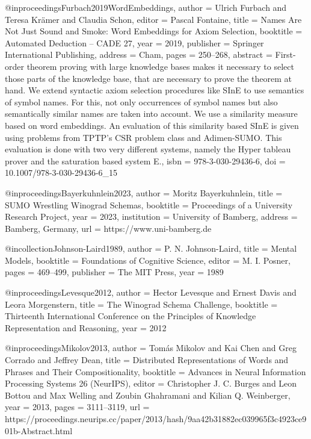 \documentclass[english,version-2020-11]{uzl-thesis}
\begin{document}
\begin{bibtex-entries}
@inproceedings{Furbach2019WordEmbeddings,
  author    = {Ulrich Furbach and Teresa Kr{\"a}mer and Claudia Schon},
  editor    = {Pascal Fontaine},
  title     = {Names Are Not Just Sound and Smoke: Word Embeddings for Axiom Selection},
  booktitle = {Automated Deduction -- CADE 27},
  year      = {2019},
  publisher = {Springer International Publishing},
  address   = {Cham},
  pages     = {250--268},
  abstract  = {First-order theorem proving with large knowledge bases makes it necessary to select those parts of the knowledge base, that are necessary to prove the theorem at hand. We extend syntactic axiom selection procedures like SInE to use semantics of symbol names. For this, not only occurrences of symbol names but also semantically similar names are taken into account. We use a similarity measure based on word embeddings. An evaluation of this similarity based SInE is given using problems from TPTP's CSR problem class and Adimen-SUMO. This evaluation is done with two very different systems, namely the Hyper tableau prover and the saturation based system E.},
  isbn      = {978-3-030-29436-6},
  doi       = {10.1007/978-3-030-29436-6_15}
}

@inproceedings{Bayerkuhnlein2023,
  author    = {Moritz Bayerkuhnlein},
  title     = {SUMO Wrestling Winograd Schemas},
  booktitle = {Proceedings of a University Research Project},
  year      = {2023},
  institution = {University of Bamberg},
  address   = {Bamberg, Germany},
  url       = {https://www.uni-bamberg.de}
}

@incollection{Johnson-Laird1989,
  author    = {P. N. Johnson-Laird},
  title     = {Mental Models},
  booktitle = {Foundations of Cognitive Science},
  editor    = {M. I. Posner},
  pages     = {469--499},
  publisher = {The MIT Press},
  year      = {1989}
}

@inproceedings{Levesque2012,
  author    = {Hector Levesque and Ernest Davis and Leora Morgenstern},
  title     = {The Winograd Schema Challenge},
  booktitle = {Thirteenth International Conference on the Principles of Knowledge Representation and Reasoning},
  year      = {2012}
}

@inproceedings{Mikolov2013,
  author    = {Tom{\'a}s Mikolov and Kai Chen and Greg Corrado and Jeffrey Dean},
  title     = {Distributed Representations of Words and Phrases and Their Compositionality},
  booktitle = {Advances in Neural Information Processing Systems 26 (NeurIPS)},
  editor    = {Christopher J. C. Burges and Leon Bottou and Max Welling and Zoubin Ghahramani and Kilian Q. Weinberger},
  year      = {2013},
  pages     = {3111--3119},
  url       = {https://proceedings.neurips.cc/paper/2013/hash/9aa42b31882ec039965f3c4923ce901b-Abstract.html}
}


\end{bibtex-entries}
\end{document}
